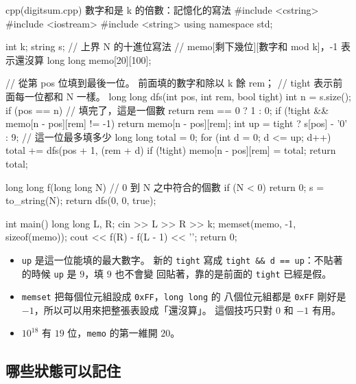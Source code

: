 \begin{example}[label=ex:dg-digitsum]{cpp}{(digitsum.cpp) 數字和是 k 的倍數：記憶化的寫法}
#include <cstring>
#include <iostream>
#include <string>
using namespace std;

int k;
string s;                    // 上界 N 的十進位寫法
// memo[剩下幾位][數字和 mod k]，-1 表示還沒算
long long memo[20][100];

// 從第 pos 位填到最後一位。 前面填的數字和除以 k 餘 rem；
// tight 表示前面每一位都和 N 一樣。
long long dfs(int pos, int rem, bool tight) {
    int n = s.size();
    if (pos == n) {                       // 填完了，這是一個數
        return rem == 0 ? 1 : 0;
    }
    if (!tight && memo[n - pos][rem] != -1) {
        return memo[n - pos][rem];
    }
    int up = tight ? s[pos] - '0' : 9;    // 這一位最多填多少
    long long total = 0;
    for (int d = 0; d <= up; d++) {
        total += dfs(pos + 1, (rem + d) %
    }
    if (!tight) {
        memo[n - pos][rem] = total;
    }
    return total;
}

long long f(long long N) {       // 0 到 N 之中符合的個數
    if (N < 0) {
        return 0;
    }
    s = to_string(N);
    return dfs(0, 0, true);
}

int main() {
    long long L, R;
    cin >> L >> R >> k;
    memset(memo, -1, sizeof(memo));
    cout << f(R) - f(L - 1) << '\n';
    return 0;
}
\end{example}


\begin{itemize}
\item \texttt{up} 是這一位能填的最大數字。 新的 \texttt{tight} 寫成
\texttt{tight \&\& d == up}：不貼著的時候 \texttt{up} 是 $9$，填 $9$ 也不會變
回貼著，靠的是前面的 \texttt{tight} 已經是假。
\item \texttt{memset} 把每個位元組設成 \texttt{0xFF}，\texttt{long long} 的
八個位元組都是 \texttt{0xFF} 剛好是 $-1$，所以可以用來把整張表設成「還沒算」。
這個技巧只對 $0$ 和 $-1$ 有用。
\item $10^{18}$ 有 $19$ 位，\texttt{memo} 的第一維開 $20$。
\end{itemize}

\subsection{哪些狀態可以記住}
\label{sec:dg-memo}

